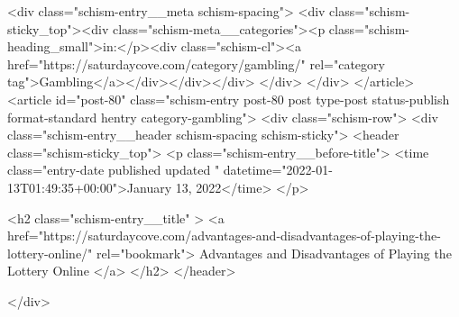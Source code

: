 {		<div class="schism-entry__meta schism-spacing">			<div class="schism-sticky_top"><div class="schism-meta__categories"><p class="schism-heading_small">in:</p><div class="schism-cl"><a href="https://saturdaycove.com/category/gambling/" rel="category tag">Gambling</a></div></div></div>		</div>
	</div>
</article>
<article id="post-80" class="schism-entry post-80 post type-post status-publish format-standard hentry category-gambling">
	<div class="schism-row">		<div class="schism-entry__header schism-spacing schism-sticky">			<header class="schism-sticky_top">				<p class="schism-entry__before-title">
					<time class="entry-date published updated " datetime="2022-01-13T01:49:35+00:00">January 13, 2022</time>				</p>

				<h2 class="schism-entry__title" >
					<a href="https://saturdaycove.com/advantages-and-disadvantages-of-playing-the-lottery-online/" rel="bookmark">
						Advantages and Disadvantages of Playing the Lottery Online					</a>
				</h2>
			</header>

					</div>

}
